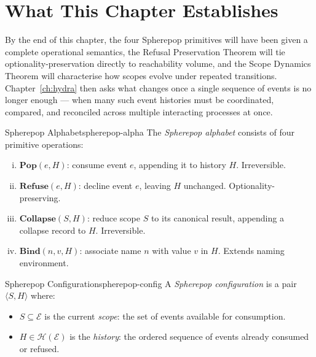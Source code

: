 \documentclass[12pt,twoside,openright]{book}
\newcommand{\hist}{\mathcal{H}}
\begin{document}
\section{What This Chapter Establishes}
\label{sec:ch24-preview}

By the end of this chapter, the four Spherepop primitives will
have been given a complete operational semantics, the Refusal
Preservation Theorem will tie optionality-preservation directly
to reachability volume, and the Scope Dynamics Theorem will
characterise how scopes evolve under repeated transitions.
Chapter~\ref{ch:hydra} then asks what changes once a single
sequence of events is no longer enough --- when many such
event histories must be coordinated, compared, and reconciled
across multiple interacting processes at once.

\begin{definition}{Spherepop Alphabet}{spherepop-alpha}
  The \emph{Spherepop alphabet} consists of four
  primitive operations:
  \begin{enumerate}[(i)]
    \item $\mathbf{Pop}(e, H)$: consume event $e$,
          appending it to history $H$. Irreversible.
    \item $\mathbf{Refuse}(e, H)$: decline event $e$,
          leaving $H$ unchanged. Optionality-preserving.
    \item $\mathbf{Collapse}(S, H)$: reduce scope $S$
          to its canonical result, appending a
          collapse record to $H$. Irreversible.
    \item $\mathbf{Bind}(n, v, H)$: associate name $n$
          with value $v$ in $H$. Extends naming
          environment.
  \end{enumerate}
\end{definition}

\begin{definition}{Spherepop Configuration}{spherepop-config}
  A \emph{Spherepop configuration} is a pair
  $\langle S, H \rangle$ where:
  \begin{itemize}[nosep]
    \item $S \subseteq \mathcal{E}$ is the current
          \emph{scope}: the set of events available
          for consumption.
    \item $H \in \hist(\mathcal{E})$ is the
          \emph{history}: the ordered sequence of
          events already consumed or refused.
  \end{itemize}
\end{definition}
\end{document}
